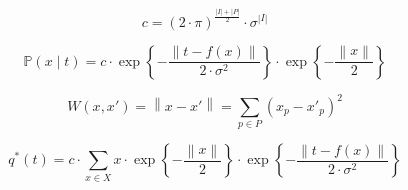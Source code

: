 \begin{equation*}
  c = \left( 2 \cdot \pi \right)^{\frac{\left| I \right| + \left| P \right|}{2}}
      \cdot \sigma^{\left| I \right|}
\end{equation*}

\begin{equation*}
    \mathbb{P}\left( x \mid t \right)
    = c
      \cdot \exp{\left\{ - \frac{\left\| t - f\left( x \right) \right\|}
                                {2 \cdot \sigma^2} \right\}}
      \cdot \exp{\left\{ - \frac{\left\| x \right\|}{2} \right\}}
\end{equation*}

\begin{equation*}
  W \left( x, x' \right)
  = \left\| x - x' \right\|
  = \sum_{p \in P} \left( x_p - x'_p \right)^2
\end{equation*}

\begin{equation*}
  q^* \left( t \right)
  = c
    \cdot \sum_{x \in X}
      x
      \cdot \exp{\left\{ - \frac{\left\| x \right\|}{2} \right\}}
      \cdot \exp{\left\{ - \frac{\left\| t - f\left( x \right) \right\|}
                                {2 \cdot \sigma^2} \right\}}
\end{equation*}
